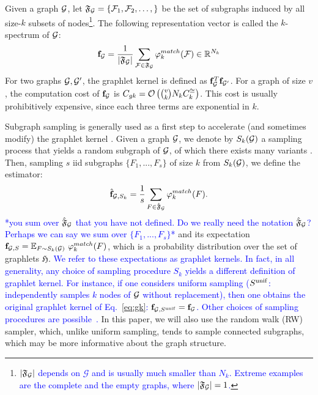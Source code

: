 \documentclass{article}
\newcommand\nt[1]{\textcolor{blue}{#1}}
\begin{document}
Given a graph $\mathcal{G}$, let $\mathfrak{F}_{\mathcal{G}}=\{\mathcal{F}_1,\mathcal{F}_2,\ldots,\}$ be the set of subgraphs induced by all size-$k$ subsets of nodes\footnote{\nt{$|\mathfrak{F}_{\mathcal{G}}|$ depends on $\mathcal{G}$ and is usually much smaller than $N_k$. Extreme examples are the complete and the empty graphs, where $|\mathfrak{F}_{\mathcal{G}}|=1$.}}. The following representation vector is called the $k$-spectrum of $\mathcal{G}$:
\begin{equation}
\label{eq:gk}
\mathbf{f}_{\mathcal{G}}=\frac{1}{|\mathfrak{F}_\mathcal{G}|}\sum_{\mathcal{F}\in\mathfrak{F}_\mathcal{G}} \varphi^{match}_k (\mathcal{F}) \in \mathbb{R}^{N_k}
\end{equation}
For two graphs $\mathcal{G},\mathcal{G}'$, the graphlet kernel is defined as $\mathbf{f}_{\mathcal{G}}^T\mathbf{f}_{\mathcal{G}'}$. %
For a graph of size $v$, the computation cost of $\mathbf{f}_{\mathcal{G}}$ is $C_{gk}= \mathcal{O}\left(\tbinom{v}{k}N_k C^{\cong}_k\right)$. This cost is usually prohibitively expensive, since each three terms are exponential in $k$.

Subgraph sampling is generally used as a first step to accelerate (and sometimes modify) the graphlet kernel \cite{graphlet_kernel}. Given a graph $\mathcal{G}$, we denote by $S_k(\mathcal{G})$ a sampling process that yields a random subgraph of $\mathcal{G}$, of which there exists many variants \cite{lesco}. Then, sampling $s$ iid subgraphs $\{F_1,...,F_s\}$ of size $k$ from $S_k(\mathcal{G})$, we define the estimator:
\begin{align}
	\label{eq:fhat_unif}
	\hat{\mathbf{f}}_{\mathcal{G},S_k} =\frac{1}{s}\sum_{F\in\hat{\mathfrak{F}}_{\mathcal{G}}} \varphi^{match}_k(F).
\end{align}
\nt{*you sum over $\hat{\mathfrak{F}}_{\mathcal{G}}$ that you have not defined. Do we really need the notation $\hat{\mathfrak{F}}_{\mathcal{G}}$? Perhaps we can say we sum over $\{F_1,...,F_s\}$*}
and its expectation $\mathbf{f}_{\mathcal{G},S} = \mathbb{E}_{F \sim S_k(\mathcal{G})} ~\varphi^{match}_k(F)$, which is a probability distribution over the set of graphlets $\mathfrak{H}$. \nt{We refer to these expectations as graphlet kernels. In fact, in all generality, any choice of sampling procedure $S_k$ yields a different definition of graphlet kernel. For instance, if one considers uniform sampling ($S^{\rm unif}$: independently samples $k$ nodes of $\mathcal{G}$ without replacement), then one obtains the original graphlet kernel of Eq.~\eqref{eq:gk}: $\mathbf{f}_{\mathcal{G}, S^{\rm unif}} = \mathbf{f}_{\mathcal{G}}$. Other choices of sampling procedures are possible~\cite{leskovec2006sampling}.} In this paper, we will also use the random walk (RW) sampler, which, unlike uniform sampling, tends to sample connected subgraphs, which may be more informative about the graph structure. 
\end{document}
